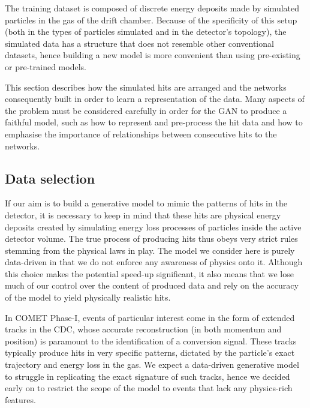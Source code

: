 The training dataset is composed of discrete energy deposits made by simulated particles in the gas of the drift chamber. Because of the specificity of this setup (both in the types of particles simulated and in the detector's topology), the simulated data has a structure that does not resemble other conventional datasets, hence building a new model is more convenient than using pre-existing or pre-trained models.

This section describes how the simulated hits are arranged and the networks consequently built in order to learn a representation of the data. Many aspects of the problem must be considered carefully in order for the GAN to produce a faithful model, such as how to represent and pre-process the hit data and how to emphasise the importance of relationships between consecutive hits to the networks.


\subsection{Data selection} %
If our aim is to build a generative model to mimic the patterns of hits in the detector, it is necessary to keep in mind that these hits are physical energy deposits created by simulating energy loss processes of particles inside the active detector volume. The true process of producing hits thus obeys very strict rules stemming from the physical laws in play. The model we consider here is purely data-driven in that we do not enforce any awareness of physics onto it. Although this choice makes the potential speed-up significant, it also means that we lose much of our control over the content of produced data and rely on the accuracy of the model to yield physically realistic hits.

In COMET Phase-I, events of particular interest come in the form of extended tracks in the CDC, whose accurate reconstruction (in both momentum and position) is paramount to the identification of a conversion signal. These tracks typically produce hits in very specific patterns, dictated by the particle's exact trajectory and energy loss in the gas. We expect a data-driven generative model to struggle in replicating the exact signature of such tracks, hence we decided early on to restrict the scope of the model to events that lack any physics-rich features. 


